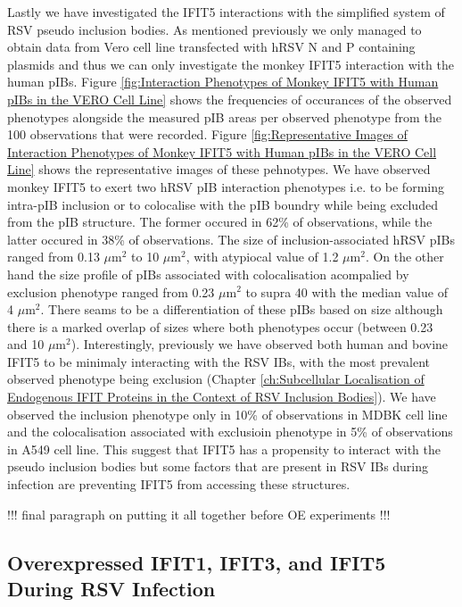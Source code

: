 Lastly we have investigated the IFIT5 interactions with the simplified system of RSV pseudo inclusion bodies. As mentioned previously we only managed to obtain data from Vero cell line transfected with hRSV N and P containing plasmids and thus we can only investigate the monkey IFIT5 interaction with the human pIBs. Figure \ref{fig:Interaction Phenotypes of Monkey IFIT5 with Human pIBs in the VERO Cell Line} shows the frequencies of occurances of the observed phenotypes alongside the measured pIB areas per observed phenotype from the 100 observations that were recorded. Figure \ref{fig:Representative Images of Interaction Phenotypes of Monkey IFIT5 with Human pIBs in the VERO Cell Line} shows the representative images of these pehnotypes. We have observed monkey IFIT5 to exert two hRSV pIB interaction phenotypes i.e. to be forming intra-pIB inclusion or to colocalise with the pIB boundry while being excluded from the pIB structure. The former occured in 62\% of observations, while the latter occured in 38\% of observations. The size of inclusion-associated hRSV pIBs ranged from 0.13 \(\mu \mbox{m}^2\) to 10 \(\mu \mbox{m}^2\), with atypiocal value of 1.2 \(\mu \mbox{m}^2\). On the other hand the size profile of pIBs associated with colocalisation acompalied by exclusion phenotype ranged from 0.23 \(\mu \mbox{m}^2\) to supra 40 with the median value of 4 \(\mu \mbox{m}^2\). There seams to be a differentiation of these pIBs based on size although there is a marked overlap of sizes where both phenotypes occur (between 0.23 and 10 \(\mu \mbox{m}^2\)). Interestingly, previously we have observed both human and bovine IFIT5 to be minimaly interacting with the RSV IBs, with the most prevalent observed phenotype being exclusion (Chapter \ref{ch:Subcellular Localisation of Endogenous IFIT Proteins in the Context of RSV Inclusion Bodies}). We have observed the inclusion phenotype only in 10\% of observations in MDBK cell line and the colocalisation associated with exclusioin phenotype in 5\% of observations in A549 cell line. This suggest that IFIT5 has a propensity to interact with the pseudo inclusion bodies but some factors that are present in RSV IBs during infection are preventing IFIT5 from accessing these structures.

!!! final paragraph on putting it all together before OE experiments !!!

\subsection{Overexpressed IFIT1, IFIT3, and IFIT5 During RSV Infection} \label{subsec:Overexpressed IFIT1, IFIT3, and IFIT5 During RSV Infection}


